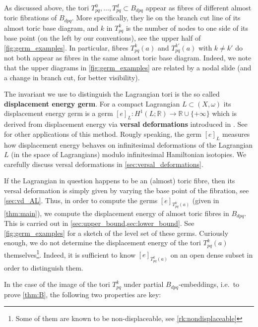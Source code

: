 \documentclass[12pt,a4paper,abstract=true,draft]{scrartcl}
\begin{document}
As discussed above, the tori $T^0_{pq}, \ldots , T^d_{pq} \subset B_{dpq}$ appear as fibres of different almost toric fibrations of $B_{dpq}$.
More specifically, they lie on the branch cut line of its almost toric base diagram, and $k$ in $T^k_{pq}$ is the number of nodes to one side of its base point (on the left by our conventions), see the upper half of \cref{fig:germ_examples}.
In particular, fibres $T^k_{pq}(a)$ and $T^{k'}_{pq}(a)$ with $k \neq k'$ do not both appear as fibres in the same almost toric base diagram.
Indeed, we note that the upper diagrams in \cref{fig:germ_examples} are related by a nodal slide (and a change in branch cut, for better visibility).

\medskip

The invariant we use to distinguish the Lagrangian tori is the so called \textbf{displacement energy germ}.
For a compact Lagrangian $L \subset (X,\omega)$ its displacement energy germ is a germ $[e]_L \colon H^1(L;\mathbb{R}) \rightarrow \mathbb{R} \cup \{+\infty\}$ which is derived from displacement energy via \textbf{versal deformations} introduced in \cite{Che96}. See \cite{brendel2020real,brendel2023local,CheSch10} for other applications of this method.
Rougly speaking, the germ $[e]_L$ measures how displacement energy behaves on infinitesimal deformations of the Lagrangian $L$ (in the space of Lagrangians) modulo infinitesimal Hamiltonian isotopies.
We carefully discuss versal deformations in \cref{sec:versal_deformations}. 

If the Lagrangian in question happens to be an (almost) toric fibre, then its versal deformation is simply given by varying the base point of the fibration, see \cref{sec:vd_AL}. Thus, in order to compute the germs $[e]_{T^k_{pq}(a)}$ (given in \cref{thm:main}), we compute the displacement energy of almost toric fibres in $B_{dpq}$. This is carried out in \cref{sec:upper_bound,sec:lower_bound}. See \cref{fig:germ_examples} for a sketch of the level set of these germs. Curiously enough, we do not determine the displacement energy of the tori $T^{k}_{pq}(a)$ themselves\footnote{Some of them are known to be non-displaceable, see \cref{rk:nondisplaceable}}. Indeed, it is sufficient to know $[e]_{T^k_{pq}(a)}$ on an open dense subset in order to distinguish them. 

In the case of the image of the tori $T^k_{pq}$ under partial $B_{dpq}$-embeddings, i.e.\ to prove \cref{thm:B}, the following two properties are key:
\end{document}
